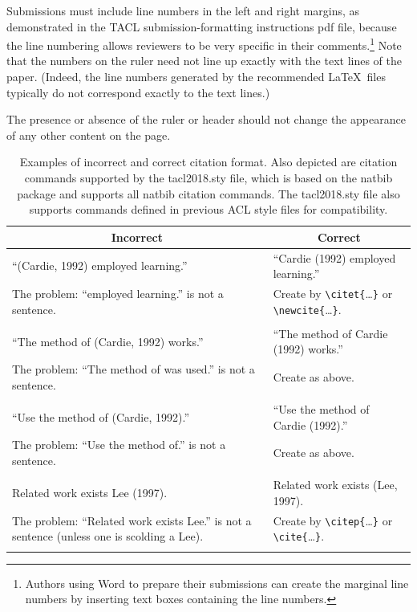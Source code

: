 \documentclass[11pt,a4paper]{article}
\newcommand{\ex}[1]{{\sf #1}}
\begin{document}
Submissions must include line numbers in the left and right
margins, as demonstrated in the TACL submission-formatting
instructions pdf file, because the line numbering allows reviewers to be very
specific in their comments.\footnote{Authors using Word to prepare their
submissions can create the marginal line numbers by inserting text
boxes containing the line numbers.}
Note that the numbers on the ruler need not line up exactly with the text lines
of the paper. (Indeed, the line numbers generated by the recommended \LaTeX{}les typically do not correspond exactly to the text lines.)
\fi

The presence or absence of the ruler or header should not change the appearance
of any other content on the page.



\begin{table}[t]
\centering
\begin{tabular}{p{7.8cm}@{\hskip .5cm}p{7.8cm}}
\multicolumn{1}{c}{{\bf Incorrect}} & \multicolumn{1}{c}{{\bf Correct}} \\  \hline
``\ex{(Cardie, 1992) employed learning.}'' &
``\ex{Cardie (1992) employed learning.}'' \\
{The problem}:  ``employed learning.'' is not a sentence.  & Create by
\verb+\citet{+\ldots\verb+}+  or \verb+\newcite{+\ldots\verb+}+. \\
\\  \hline
``\ex{The method of (Cardie, 1992) works.}'' &
``\ex{The method of Cardie (1992) works.}''  \\
{The problem}:  ``The method of was used.'' is not a sentence.  & Create as
above.\\ \\\hline
``\ex{Use the method of (Cardie, 1992).}'' &
``\ex{Use the method of Cardie (1992).}''  \\
{The problem}:  ``Use the method of.'' is not a sentence.  & Create as
above.\\ \\\hline
\ex{Related work exists Lee (1997).} & \ex{Related work exists (Lee,
1997).} \\
{The problem}:  ``Related work exists Lee.'' is not a sentence (unless one
is scolding a Lee). & Create by
\verb+\citep{+\ldots\verb+}+  or \verb+\cite{+\ldots\verb+}+. \\
\\  \hline
\end{tabular}
\caption{\label{tab:cite-commands} Examples of incorrect and correct citation
  format.  Also depicted are citation commands supported by the
  tacl2018.sty file, which is based on the natbib package and
  supports all natbib citation commands.
  The tacl2018.sty file also supports commands defined in previous ACL style
  files
  for compatibility.
  }
\end{table}
\end{document}
